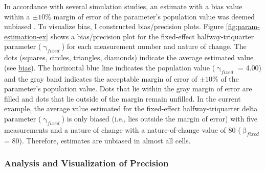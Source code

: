 \documentclass[
12pt, %
twoside,
english]{guelphthesis}
\begin{document}
In accordance with several simulation studies, an estimate with a bias value within a \(\pm10\%\) margin of error of the parameter's population value was deemed unbiased \autocite{muthen1997}. To visualize bias, I constructed bias/precision plots. Figure \ref{fig:param-estimation-ex} shows a bias/precision plot for the fixed-effect halfway-triquarter parameter (\(\upgamma_{fixed}\)) for each measurement number and nature of change. The dots (squares, circles, triangles, diamonds) indicate the average estimated value (see \protect\hyperlink{bias-comp}{bias}). The horizontal blue line indicates the population value (\(\upgamma_{fixed}\) = 4.00) and the gray band indicates the acceptable margin of error of \(\pm10\%\) of the parameter's population value. Dots that lie within the gray margin of error are filled and dots that lie outside of the margin remain unfilled. In the current example, the average value estimated for the fixed-effect halfway-triquarter delta parameter (\(\upgamma_{fixed}\)) is only biased (i.e., lies outside the margin of error) with five measurements and a nature of change with a nature-of-change value of 80 (\(\upbeta_{fixed}\) = 80). Therefore, estimates are unbiased in almost all cells.

\hypertarget{precision-analysis}{%
\subsubsection{Analysis and Visualization of Precision}\label{precision-analysis}}
\end{document}
